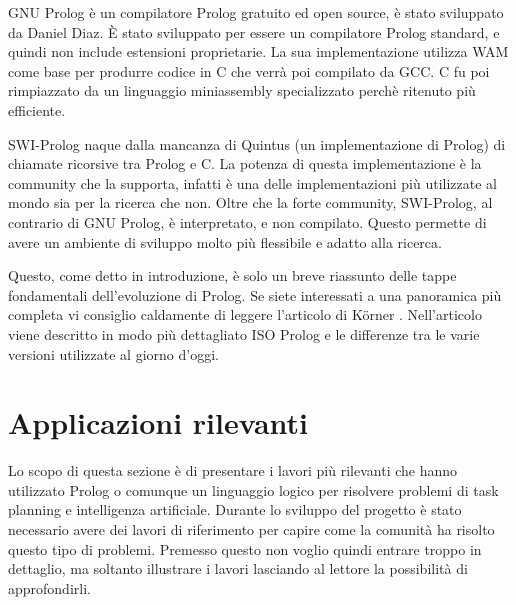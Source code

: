 GNU Prolog è un compilatore Prolog gratuito ed open source, è stato sviluppato da Daniel Diaz. È stato sviluppato per essere un compilatore Prolog standard, e quindi non include estensioni proprietarie. La sua implementazione utilizza WAM come base per produrre codice in C che verrà poi compilato da GCC. C fu poi rimpiazzato da un linguaggio miniassembly specializzato
perchè ritenuto più efficiente. 

SWI-Prolog naque dalla mancanza di Quintus (un implementazione di Prolog) di chiamate ricorsive tra Prolog e C. La potenza di questa implementazione è la community che la supporta, infatti è una delle implementazioni più utilizzate al mondo sia per la ricerca che non. Oltre che la forte community,
SWI-Prolog, al contrario di GNU Prolog, è interpretato, e non compilato. Questo permette di avere un ambiente di sviluppo molto più flessibile e adatto alla ricerca.

Questo, come detto in introduzione, è solo un breve riassunto delle tappe fondamentali dell'evoluzione di Prolog. Se siete interessati a una panoramica più completa vi consiglio caldamente di leggere l'articolo di K{\"o}rner \cite{korner2022fifty}. 
Nell'articolo viene descritto in modo più dettagliato ISO Prolog e le differenze tra le varie versioni utilizzate al giorno d'oggi.
\section{Applicazioni rilevanti}
\label{sec:lavori}
Lo scopo di questa sezione è di presentare i lavori più rilevanti che hanno utilizzato Prolog o comunque un linguaggio logico per risolvere problemi di task planning e intelligenza artificiale.
Durante lo sviluppo del progetto è stato necessario avere dei lavori di riferimento per capire come la comunità ha risolto questo tipo di problemi.
Premesso questo non voglio quindi entrare troppo in dettaglio, ma soltanto illustrare i lavori lasciando al lettore la possibilità di approfondirli.

